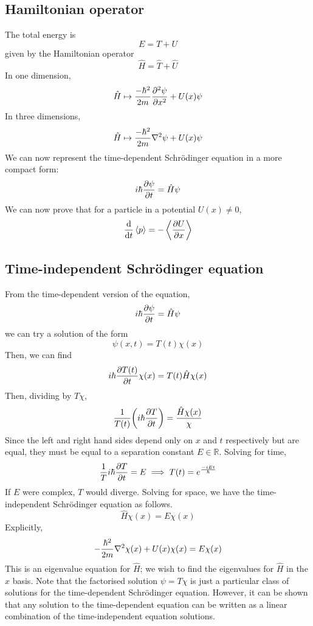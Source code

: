 \subsection{Hamiltonian operator}
The total energy is
\[
	E = T + U
\]
given by the Hamiltonian operator
\[
	\hat H = \hat T + \hat U
\]
In one dimension,
\[
	\hat H \mapsto \frac{-\hbar^2}{2m} \pdv[2]{\psi}{x} + U(x) \psi
\]
In three dimensions,
\[
	\hat H \mapsto \frac{-\hbar^2}{2m} \laplacian \psi + U(x) \psi
\]
We can now represent the time-dependent Schr\"odinger equation in a more compact form:
\[
	i\hbar \pdv{\psi}{t} = \hat H \psi
\]
We can now prove that for a particle in a potential \( U(x) \neq 0 \),
\[
	\dv{t} \left\langle{p}\right\rangle = -\left\langle{\pdv{U}{x}}\right\rangle
\]

\subsection{Time-independent Schr\"odinger equation}
From the time-dependent version of the equation,
\[
	i\hbar \pdv{\psi}{t} = \hat H \psi
\]
we can try a solution of the form
\[
	\psi(x,t) = T(t) \chi(x)
\]
Then, we can find
\[
	i \hbar \pdv{T(t)}{t} \chi(x) = T(t) \hat H \chi(x)
\]
Then, dividing by \( T \chi \),
\[
	\frac{1}{T(t)} \qty(i \hbar \pdv{T}{t}) = \frac{\hat H \chi(x)}{\chi}
\]
Since the left and right hand sides depend only on \( x \) and \( t \) respectively but are equal, they must be equal to a separation constant \( E \in \mathbb R \).
Solving for time,
\[
	\frac{1}{T} i \hbar \pdv{T}{t} = E \implies T(t) = e^{\frac{-i Et}{\hbar}}
\]
If \( E \) were complex, \( T \) would diverge.
Solving for space, we have the time-independent Schr\"odinger equation as follows.
\[
	\hat H \chi(x) = E \chi(x)
\]
Explicitly,
\[
	-\frac{\hbar^2}{2m} \laplacian{\chi(x)} + U(x) \chi(x) = E \chi(x)
\]
This is an eigenvalue equation for \( \hat H \); we wish to find the eigenvalues for \( \hat H \) in the \( x \) basis.
Note that the factorised solution \( \psi = T \chi \) is just a particular class of solutions for the time-dependent Schr\"odinger equation.
However, it can be shown that any solution to the time-dependent equation can be written as a linear combination of the time-independent equation solutions.
